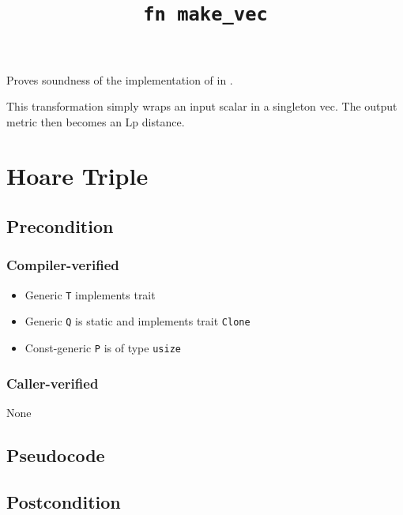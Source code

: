 \documentclass{article}
\title{\texttt{fn make\_vec}}
\author{\MichaelShoemateAuthor}
\date{}
\begin{document}
\maketitle

\contrib
Proves soundness of the implementation of  in .

This transformation simply wraps an input scalar in a singleton vec.
The output metric then becomes an Lp distance.
\section{Hoare Triple}
\subsection*{Precondition}
\subsubsection*{Compiler-verified}
\begin{itemize}
    \item Generic \texttt{T} implements trait 
    \item Generic \texttt{Q} is static and implements trait \texttt{Clone}
    \item Const-generic \texttt{P} is of type \texttt{usize}
\end{itemize}

\subsubsection*{Caller-verified}
None

\subsection*{Pseudocode}


\subsection*{Postcondition}
\begin{theorem}
\end{theorem}
\end{document}
